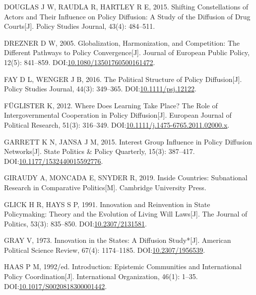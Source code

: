 \documentclass[
  12pt,
]{ctexart}
\newlength{\cslhangindent}
\newlength{\cslentryspacingunit} %
\newenvironment{CSLReferences}[2] %
 {%
  \setlength{\parindent}{0pt}
  \ifodd #1
  \let\oldpar\par
  \def\par{\hangindent=\cslhangindent\oldpar}
  \fi
  \setlength{\parskip}{#2\cslentryspacingunit}
 }%
 {}
\begin{document}
\begin{CSLReferences}{1}{0}
\leavevmode{}%
DOUGLAS J W, RAUDLA R, HARTLEY R E, 2015. Shifting Constellations of Actors and Their Influence on Policy Diffusion: {A} Study of the Diffusion of Drug Courts{[}J{]}. Policy Studies Journal, 43(4): 484--511.

\leavevmode{}%
DREZNER D W, 2005. Globalization, Harmonization, and Competition: The Different Pathways to Policy Convergence{[}J{]}. Journal of European Public Policy, 12(5): 841--859. DOI:\href{https://doi.org/10.1080/13501760500161472}{10.1080/13501760500161472}.

\leavevmode{}%
FAY D L, WENGER J B, 2016. The {Political Structure} of {Policy Diffusion}{[}J{]}. Policy Studies Journal, 44(3): 349--365. DOI:\href{https://doi.org/10.1111/psj.12122}{10.1111/psj.12122}.

\leavevmode{}%
FÜGLISTER K, 2012. Where Does Learning Take Place? {The} Role of Intergovernmental Cooperation in Policy Diffusion{[}J{]}. European Journal of Political Research, 51(3): 316--349. DOI:\href{https://doi.org/10.1111/j.1475-6765.2011.02000.x}{10.1111/j.1475-6765.2011.02000.x}.

\leavevmode{}%
GARRETT K N, JANSA J M, 2015. Interest {Group Influence} in {Policy Diffusion Networks}{[}J{]}. State Politics \& Policy Quarterly, 15(3): 387--417. DOI:\href{https://doi.org/10.1177/1532440015592776}{10.1177/1532440015592776}.

\leavevmode{}%
GIRAUDY A, MONCADA E, SNYDER R, 2019. Inside Countries: {Subnational} Research in Comparative Politics{[}M{]}. {Cambridge University Press}.

\leavevmode{}%
GLICK H R, HAYS S P, 1991. Innovation and {Reinvention} in {State Policymaking}: {Theory} and the {Evolution} of {Living Will Laws}{[}J{]}. The Journal of Politics, 53(3): 835--850. DOI:\href{https://doi.org/10.2307/2131581}{10.2307/2131581}.

\leavevmode{}%
GRAY V, 1973. Innovation in the {States}: {A Diffusion Study}*{[}J{]}. American Political Science Review, 67(4): 1174--1185. DOI:\href{https://doi.org/10.2307/1956539}{10.2307/1956539}.

\leavevmode{}%
HAAS P M, 1992/ed. Introduction: Epistemic Communities and International Policy Coordination{[}J{]}. International Organization, 46(1): 1--35. DOI:\href{https://doi.org/10.1017/S0020818300001442}{10.1017/S0020818300001442}.


\end{CSLReferences}
\end{document}
